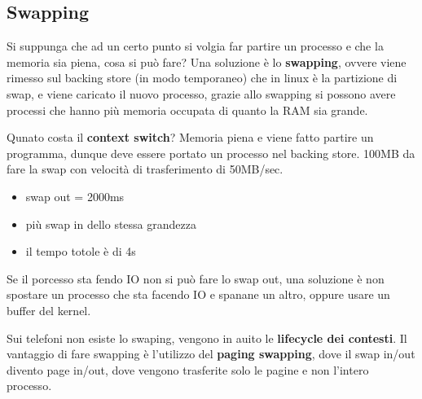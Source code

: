 \documentclass[12pt]{article}
\begin{document}
\subsection{Swapping}
Si suppunga che ad un certo punto si volgia far partire un processo e che la memoria sia piena, cosa si pu\`o fare? Una soluzione \`e lo \textbf{swapping}, ovvere viene rimesso sul backing store (in modo temporaneo) che in linux \`e la partizione di swap, e viene caricato il nuovo processo, grazie allo swapping si possono avere processi che hanno pi\`u memoria occupata di quanto la RAM sia grande.
\begin{example}{}{}
  Qunato costa il \textbf{context switch}? Memoria piena e viene fatto partire un programma, dunque deve essere portato un processo nel backing store. 100MB da fare la swap con velocit\`a di trasferimento di 50MB/sec.
  \begin{itemize}
    \item swap out = 2000ms
    \item pi\`u swap in dello stessa grandezza
    \item il tempo totole \`e di 4s
  \end{itemize}
  Se il porcesso sta fendo IO non si pu\`o fare lo swap out, una soluzione \`e non spostare un processo che sta facendo IO e spanane un altro, oppure usare un buffer del kernel.
\end{example}
Sui telefoni non esiste lo swaping, vengono in auito le \textbf{lifecycle dei contesti}. Il vantaggio di fare swapping \`e l'utilizzo del \textbf{paging swapping}, dove il swap in/out divento page in/out, dove vengono trasferite solo le pagine e non l'intero processo.
\end{document}
